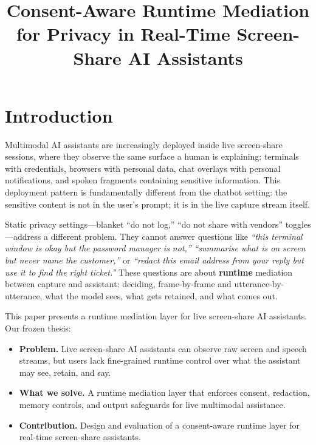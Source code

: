 \documentclass[sn-mathphys-num]{sn-jnl}
\title[Consent-Aware Runtime Mediation]{%
  Consent-Aware Runtime Mediation for Privacy in Real-Time
  Screen-Share AI Assistants}
\author*[1]{\fnm{Neeraj Kumar} \sur{Singh}}
\affil*[1]{%
  \orgname{Parafin, Inc.},%
  \orgaddress{%
    \city{San Francisco},%
    \state{California},%
    \country{USA}%
  }%
}
\begin{document}
\maketitle

\section{Introduction}\label{sec:intro}

Multimodal AI assistants are increasingly deployed inside live screen-share
sessions, where they observe the same surface a human is explaining:
terminals with credentials, browsers with personal data, chat overlays with
personal notifications, and spoken fragments containing sensitive information.
This deployment pattern is fundamentally different from the chatbot setting:
the sensitive content is not in the user's prompt; it is in the live capture
stream itself.

Static privacy settings---blanket ``do not log,'' ``do not share with
vendors'' toggles---address a different problem.
They cannot answer questions like \textit{``this terminal window is okay but
the password manager is not,''} \textit{``summarise what is on screen but
never name the customer,''} or \textit{``redact this email address from your
reply but use it to find the right ticket.''}
These questions are about \textbf{runtime} mediation between capture and
assistant: deciding, frame-by-frame and utterance-by-utterance, what the
model sees, what gets retained, and what comes out.

This paper presents a runtime mediation layer for live screen-share AI
assistants.
Our frozen thesis:

\begin{itemize}
  \item \textbf{Problem.}
        Live screen-share AI assistants can observe raw screen and speech
        streams, but users lack fine-grained runtime control over what the
        assistant may see, retain, and say.
  \item \textbf{What we solve.}
        A runtime mediation layer that enforces consent, redaction, memory
        controls, and output safeguards for live multimodal assistance.
  \item \textbf{Contribution.}
        Design and evaluation of a consent-aware runtime layer for real-time
        screen-share assistants.
\end{itemize}
\end{document}
